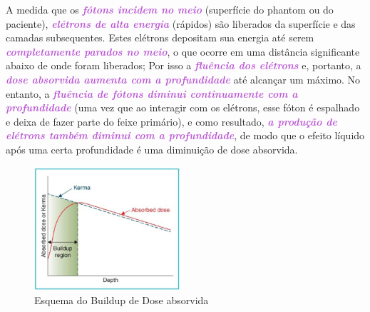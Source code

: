 \documentclass[11pt,a4paper]{article}
\begin{document}
	A medida que os \textcolor{MediumOrchid}{\textbf{\textit{fótons incidem no meio}}} (superfície do phantom ou do paciente), \textcolor{MediumOrchid}{\textbf{\textit{elétrons de alta energia}}} (rápidos) são liberados da superfície e das camadas subsequentes. Estes elétrons depositam sua energia até serem \textcolor{MediumOrchid}{\textbf{\textit{completamente parados no meio}}}, o que ocorre em uma distância significante abaixo de onde foram liberados; Por isso a \textcolor{MediumOrchid}{\textbf{\textit{fluência dos elétrons}}} e, portanto, a \textcolor{MediumOrchid}{\textbf{\textit{dose absorvida aumenta com a profundidade}}} até alcançar um máximo. No entanto, a \textcolor{MediumOrchid}{\textbf{\textit{fluência de fótons diminui continuamente com a profundidade}}} (uma vez que ao interagir com os elétrons, esse fóton é espalhado e deixa de fazer parte do feixe primário), e como resultado, \textcolor{MediumOrchid}{\textbf{\textit{a produção de elétrons também diminui com a profundidade}}}, de modo que o efeito líquido após uma certa profundidade é uma diminuição de dose absorvida. 

		\begin{figure}
			\centering
			\includegraphics[width=0.48\textwidth]{Imagens/esquemaBuildup.JPG}
			\caption{Esquema do Buildup de Dose absorvida}
			\label{fig:esquemaBuildup}
		\end{figure}
\end{document}
